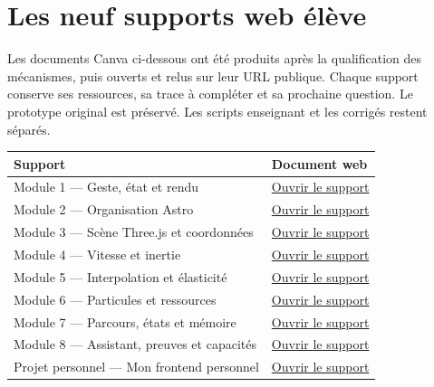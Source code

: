\documentclass[
  canadien,
  11pt,
  a4paper,
]{report}
\newcounter{none} %
\begin{document}
\chapter{Les neuf supports web
élève}\label{les-neuf-supports-web-uxe9luxe8ve}

Les documents Canva ci-dessous ont été produits après la qualification
des mécanismes, puis ouverts et relus sur leur URL publique. Chaque
support conserve ses ressources, sa trace à compléter et sa prochaine
question. Le prototype original est préservé. Les scripts enseignant et
les corrigés restent séparés.

{\def\LTcaptype{none} %
\begin{longtable}[]{@{}
  >{\raggedright\arraybackslash}p{}
  >{\raggedright\arraybackslash}p{}@{}}
\toprule\noalign{}
\begin{minipage}[b]{\linewidth}\raggedright
Support
\end{minipage} & \begin{minipage}[b]{\linewidth}\raggedright
Document web
\end{minipage} \\
\midrule\noalign{}
\endhead
\bottomrule\noalign{}
\endlastfoot
Module 1 --- Geste, état et rendu &
\href{https://orbit-formation-module-1.my.canva.site/}{Ouvrir le
support} \\
Module 2 --- Organisation Astro &
\href{https://orbit-formation-module-1.my.canva.site/orbit-formation-module-2-organisation-astro}{Ouvrir
le support} \\
Module 3 --- Scène Three.js et coordonnées &
\href{https://orbit-formation-module-1.my.canva.site/orbit-formation-module-3-sc-ne-three-js-et-coordonn-es}{Ouvrir
le support} \\
Module 4 --- Vitesse et inertie &
\href{https://orbit-formation-module-1.my.canva.site/orbit-formation-module-4-vitesse-et-inertie}{Ouvrir
le support} \\
Module 5 --- Interpolation et élasticité &
\href{https://orbit-formation-module-1.my.canva.site/orbit-formation-module-5-interpolation-et-lasticit}{Ouvrir
le support} \\
Module 6 --- Particules et ressources &
\href{https://orbit-formation-module-1.my.canva.site/orbit-formation-module-6-particules-et-ressources}{Ouvrir
le support} \\
Module 7 --- Parcours, états et mémoire &
\href{https://orbit-formation-module-1.my.canva.site/orbit-formation-module-7-parcours-tats-et-m-moire}{Ouvrir
le support} \\
Module 8 --- Assistant, preuves et capacités &
\href{https://orbit-formation-module-1.my.canva.site/orbit-formation-module-8-assistant-preuves-et-capacit-s}{Ouvrir
le support} \\
Projet personnel --- Mon frontend personnel &
\href{https://orbit-formation-module-1.my.canva.site/orbit-formation-projet-mon-frontend-personnel}{Ouvrir
le support} \\
\end{longtable}
}
\end{document}
